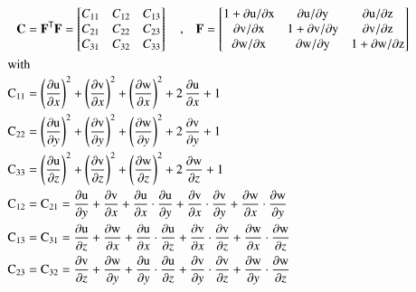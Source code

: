 \begin{subequations}
	\begin{align}
	\mathbf{C} &= \mathbf{F}^{\mathsf{T}} \mathbf{F} =
	\begin{bmatrix}
	C_{11} & C_{12} & C_{13} \\
	C_{21} & C_{22} & C_{23} \\
	C_{31} & C_{32} & C_{33}
	\end{bmatrix} \quad \textrm{,} \quad
	\mathbf{F} =  
	\begin{bmatrix}
	1 + \mathrm{\partial u / \partial x} & \mathrm{\partial u / \partial y} & \mathrm{\partial u / \partial z} \\
	\mathrm{\partial v / \partial x} & 1 + \mathrm{\partial v / \partial y} & \mathrm{\partial v / \partial z} \\
	\mathrm{\partial w / \partial x} & \mathrm{\partial w / \partial y} & 1 + \mathrm{\partial w / \partial z}
	\end{bmatrix}\\
	\intertext{with}
	\mathrm{C_{11}} & = \left(\frac{\mathrm{\partial u}}{\partial x}\right)^2 + \left(\frac{\mathrm{\partial v}}{\partial x}\right)^2 + \left(\frac{\mathrm{\partial w}}{\partial x}\right)^2 + 2\, \frac{\mathrm{\partial u}}{\partial x}  + 1\\
	\mathrm{C_{22}} & = \left(\frac{\mathrm{\partial u}}{\partial y}\right)^2 + \left(\frac{\mathrm{\partial v}}{\partial y}\right)^2 + \left(\frac{\mathrm{\partial w}}{\partial y}\right)^2 + 2\, \frac{\mathrm{\partial v}}{\partial y} + 1\\
	\mathrm{C_{33}} & = \left(\frac{\mathrm{\partial u}}{\partial z}\right)^2 + \left(\frac{\mathrm{\partial v}}{\partial z}\right)^2 + \left(\frac{\mathrm{\partial w}}{\partial z}\right)^2 + 2\, \frac{\mathrm{\partial w}}{\partial z} + 1 \\
	\mathrm{C_{12}} & = \mathrm{C_{21}} = \frac{\mathrm{\partial u}}{\partial y} + \frac{\mathrm{\partial v}}{\partial x} + \frac{\mathrm{\partial u}}{\partial x} \cdot \frac{\mathrm{\partial u}}{\partial y} + \frac{\mathrm{\partial v}}{\partial x} \cdot \frac{\mathrm{\partial v}}{\partial y} + \frac{\mathrm{\partial w}}{\partial x} \cdot \frac{\mathrm{\partial w}}{\partial y}\\
    \mathrm{C_{13}} & = \mathrm{C_{31}} = \frac{\mathrm{\partial u}}{\partial z} + \frac{\mathrm{\partial w}}{\partial x} + \frac{\mathrm{\partial u}}{\partial x} \cdot \frac{\mathrm{\partial u}}{\partial z} + \frac{\mathrm{\partial v}}{\partial x} \cdot \frac{\mathrm{\partial v}}{\partial z} + \frac{\mathrm{\partial w}}{\partial x} \cdot \frac{\mathrm{\partial w}}{\partial z} \\
    \mathrm{C_{23}} & = \mathrm{C_{32}} = \frac{\mathrm{\partial v}}{\partial z} + \frac{\mathrm{\partial w}}{\partial y} + \frac{\mathrm{\partial u}}{\partial y} \cdot \frac{\mathrm{\partial u}}{\partial z} + \frac{\mathrm{\partial v}}{\partial y} \cdot \frac{\mathrm{\partial v}}{\partial z} + \frac{\mathrm{\partial w}}{\partial y} \cdot \frac{\mathrm{\partial w}}{\partial z}
	\end{align}
\end{subequations}
